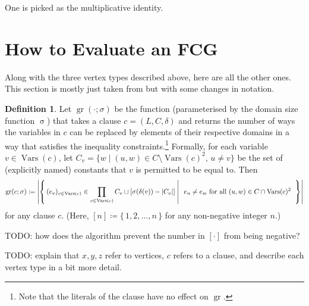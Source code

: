 \documentclass{article}
\theoremstyle{definition}
\newtheorem{definition}{Definition}
\theoremstyle{remark}
\DeclareMathOperator{\size}{\sigma}
\DeclareMathOperator{\Vars}{Vars}
\DeclareMathOperator{\gr}{gr}
\begin{document}
One is picked as the multiplicative identity.

\section{How to Evaluate an FCG} \label{sec:evaluation}

Along with the three vertex types described above, here are all the other ones. This section is mostly just taken from \cite{DBLP:conf/ijcai/BroeckTMDR11} but with some changes in notation.

\begin{definition}
  Let $\gr(\cdot; \sigma)$ be the function (parameterised by the domain size function $\size$) that takes a clause $c = (L, C, \delta)$ and returns the number of ways the variables in $c$ can be replaced by elements of their respective domains in a way that satisfies the inequality constraints.\footnote{Note that the literals of the clause have no effect on $\gr$.} Formally, for each variable $v \in \Vars(c)$, let $C_v = \{ w \mid (u, w) \in C \setminus \Vars(c)^2 \text{, }u \ne v \}$ be the set of (explicitly named) constants that $v$ is permitted to be equal to. Then
  \[
  \gr(c; \sigma) \coloneqq \left|\left\{\, (e_v)_{v \in \Vars(c)} \in \prod_{v \in \Vars(c)} C_v \sqcup [\sigma(\delta(v)) - |C_v|] \;\middle|\; \right.\right. e_u \ne e_w \text{ for all } (u, w) \in C \cap \Vars(c)^2 \left.\left. \vphantom{\prod_{v \in \Vars(c)}} \,\right\}\right|
  \]
  for any clause $c$. (Here, $[n] \coloneqq \{\,1, 2, \dots, n\,\}$ for any non-negative integer $n$.)
\end{definition}

TODO: how does the algorithm prevent the number in $[\cdot]$ from being negative?

TODO: explain that $x, y, z$ refer to vertices, $c$ refers to a clause, and describe each vertex type in a bit more detail.
\end{document}
